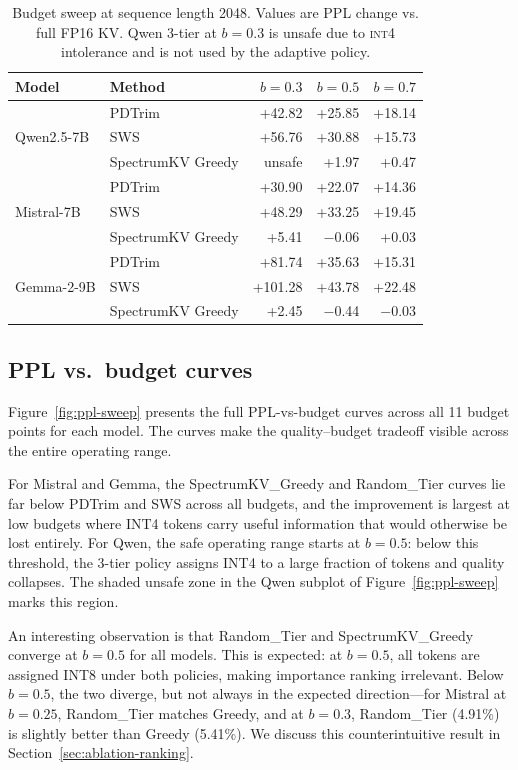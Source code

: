 \documentclass[11pt]{article}
\newcommand{\method}{SpectrumKV}
\newcommand{\budget}{b}
\newcommand{\pct}{\%}
\newcommand{\intiv}{\textsc{int4}}
\theoremstyle{plain}
\theoremstyle{definition}
\begin{document}
\begin{table}[t]
\centering
\caption{Budget sweep at sequence length 2048.  Values are PPL change vs. full FP16 KV.  Qwen 3-tier at $\budget=0.3$ is unsafe due to \intiv{} intolerance and is not used by the adaptive policy.}
\label{tab:budget}
\small
\begin{tabular}{llrrr}
\toprule
Model & Method & $\budget=0.3$ & $\budget=0.5$ & $\budget=0.7$ \\
\midrule
\multirow{3}{*}{Qwen2.5-7B}
  & PDTrim & +42.82 & +25.85 & +18.14 \\
  & SWS & +56.76 & +30.88 & +15.73 \\
  & \method{} Greedy & unsafe & +1.97 & +0.47 \\
\midrule
\multirow{3}{*}{Mistral-7B}
  & PDTrim & +30.90 & +22.07 & +14.36 \\
  & SWS & +48.29 & +33.25 & +19.45 \\
  & \method{} Greedy & +5.41 & $-$0.06 & +0.03 \\
\midrule
\multirow{3}{*}{Gemma-2-9B}
  & PDTrim & +81.74 & +35.63 & +15.31 \\
  & SWS & +101.28 & +43.78 & +22.48 \\
  & \method{} Greedy & +2.45 & $-$0.44 & $-$0.03 \\
\bottomrule
\end{tabular}
\end{table}

\subsection{PPL vs.\ budget curves}
\label{sec:ppl-curves}

Figure~\ref{fig:ppl-sweep} presents the full PPL-vs-budget curves across all 11 budget points for each model.  The curves make the quality--budget tradeoff visible across the entire operating range.

For Mistral and Gemma, the \method{}\_Greedy and Random\_Tier curves lie far below PDTrim and SWS across all budgets, and the improvement is largest at low budgets where INT4 tokens carry useful information that would otherwise be lost entirely.  For Qwen, the safe operating range starts at $\budget=0.5$: below this threshold, the 3-tier policy assigns INT4 to a large fraction of tokens and quality collapses.  The shaded unsafe zone in the Qwen subplot of Figure~\ref{fig:ppl-sweep} marks this region.

An interesting observation is that Random\_Tier and \method{}\_Greedy converge at $\budget=0.5$ for all models.  This is expected: at $\budget=0.5$, all tokens are assigned INT8 under both policies, making importance ranking irrelevant.  Below $\budget=0.5$, the two diverge, but not always in the expected direction---for Mistral at $\budget=0.25$, Random\_Tier matches Greedy, and at $\budget=0.3$, Random\_Tier (4.91\pct{}) is slightly better than Greedy (5.41\pct{}).  We discuss this counterintuitive result in Section~\ref{sec:ablation-ranking}.
\end{document}
